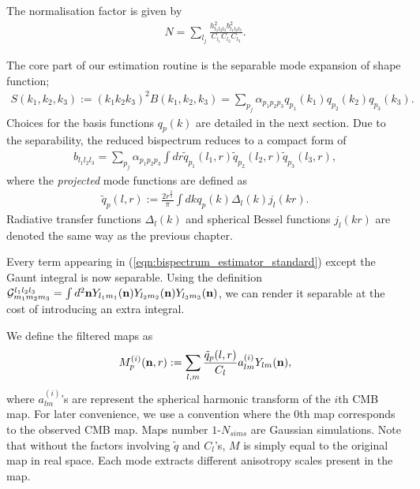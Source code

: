 The normalisation factor is given by
\begin{align}
	N = \sum_{l_j} \frac{h_{l_1 l_2 l_3}^2 b_{l_1 l_2 l_3}^2}{C_{l_1} C_{l_2} C_{l_3}}.
\end{align}

The core part of our estimation routine is the separable mode expansion of shape function;
\begin{align}
	S(k_1, k_2, k_3) := (k_1 k_2 k_3)^2 B(k_1, k_2, k_3) = \sum_{p_j} \alpha_{p_1 p_2 p_3} q_{p_1}(k_1) q_{p_2}(k_2) q_{p_3}(k_3).
\end{align}
Choices for the basis functions $q_p(k)$ are detailed in the next section. Due to the separability, the reduced bispectrum reduces to a compact form of
\begin{align}
	b_{l_1 l_2 l_3} = \sum_{p_j} \alpha_{p_1 p_2 p_3} \int dr \tilde{q}_{p_1}(l_1,r) \tilde{q}_{p_2}(l_2,r) \tilde{q}_{p_3}(l_3,r),
\end{align}
where the \textit{projected} mode functions are defined as
\begin{align}
	\tilde{q}_{p}(l,r) := \frac{2r^\frac{2}{3}}{\pi} \int dk q_p(k) \Delta_l(k) j_l (kr).
\end{align}
Radiative transfer functions $\Delta_l(k)$ and spherical Bessel functions $j_l(kr)$ are denoted the same way as the previous chapter.

Every term appearing in (\ref{eqn:bispectrum_estimator_standard}) except the Gaunt integral is now separable. Using the definition $\mathcal{G}^{l_1 l_2 l_3}_{m_1 m_2 m_3} = \int d^2 \mathbf{n} Y_{l_1 m_1}(\mathbf{n}) Y_{l_2 m_2}(\mathbf{n}) Y_{l_3 m_3}(\mathbf{n})$, we can render it separable at the cost of introducing an extra integral.

We define the filtered maps as
\begin{align}
	M^{(i)}_p (\mathbf{n}, r) := \sum_{l,m} \frac{\tilde{q}_p (l,r)}{C_l} a^{(i)}_{lm} Y_{lm} (\mathbf{n}), \label{def:filtered_maps}
\end{align}
where $a^{(i)}_{lm}$'s are represent the spherical harmonic transform of the $i$th CMB map. For later convenience, we use a convention where the $0$th map corresponds to the observed CMB map. Maps number $1$-$N_{sims}$ are Gaussian simulations. Note that without the factors involving $\tilde{q}$ and $C_l$'s, $M$ is simply equal to the original map in real space. Each mode extracts different anisotropy scales present in the map.

